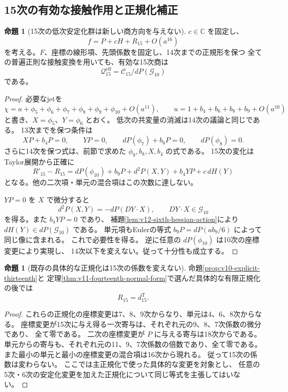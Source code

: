 \documentclass[a4paper,11pt]{ltjsarticle}
\theoremstyle{definition}
\newtheorem{proposition}[theorem]{命題}
\newcommand{\CC}{\mathbb C}
\begin{document}
\subsection{15次の有効な接触作用と正規化補正}
\label{subsec:v12-filtered-contact}

\begin{proposition}[15次の低次安定化群は新しい商方向を与えない]
\label{prop:v12-effective-contact-fifteen}
$c\in\CC$ を固定し、
\[
 f=P+cH+R_{15}+O(a^{16})
\]
を考える。$F$、座標の線形項、先頭係数を固定し、14次までの正規形を保つ
全ての普遍正則な接触変換を用いても、有効な15次商は
\[
 \mathcal Q^{\mathrm{eff}}_{15}
   =\mathcal C_{15}/dP(\mathcal G_{10})
\]
である。
\end{proposition}
\begin{proof}
必要なjetを
\[
 \chi=a+\phi_5+\phi_6+\phi_7+\phi_8+\phi_9+\phi_{10}+O(a^{11}),
 \qquad u=1+b_4+b_6+b_8+b_9+O(a^{10})
\]
と書き、$X=\phi_5$、$Y=\phi_6$ とおく。
低次の共変量の消滅は14次の議論と同じである。
13次までを保つ条件は
\[
 XP+b_4P=0,\qquad YP=0,\qquad
 dP(\phi_7)+b_6P=0,\qquad dP(\phi_8)=0.
\]
さらに14次を保つ式は、前節で求めた
$\phi_9,b_8,X,b_4$ の式である。
15次の変化はTaylor展開から正確に
\[
 R'_{15}-R_{15}
 =dP(\phi_{10})+b_9P+d^2P(X,Y)+b_4YP+c\,dH(Y)
\]
となる。他の二次項・単元の混合項はこの次数に達しない。

$YP=0$ を $X$ で微分すると
\[
 d^2P(X,Y)=-dP(DY\cdot X),\qquad DY\cdot X\in\mathcal G_{10}
\]
を得る。また $b_4YP=0$ であり、
補題\ref{lem:v12-sixth-hessian-action}により
$dH(Y)\in dP(\mathcal G_{10})$ である。
単元項もEulerの等式 $b_9P=dP(ab_9/6)$ によって同じ像に含まれる。
これで必要性を得る。
逆に任意の $dP(\phi_{10})$ は10次の座標変更により実現し、
14次以下を変えない。従って十分性も成立する。
\end{proof}

\begin{proposition}[既存の具体的な正規化は15次の係数を変えない]
\label{prop:v12-actual-fifteen-correction}
命題\ref{prop:v10-explicit-thirteenth}と
定理\ref{thm:v11-fourteenth-normal-form}で選んだ具体的な有限正規化の後では
\[
 R_{15}=d^{\mathrm T}_{15}.
\]
\end{proposition}
\begin{proof}
これらの正規化の座標変更は7、8、9次からなり、単元は4、6、8次からなる。
座標変更が15次に与え得る一次寄与は、それぞれ元の9、8、7次係数の微分であり、
全て零である。
二次の座標変更が $P$ に与える寄与は18次からである。
単元からの寄与も、それぞれ元の11、9、7次係数の倍数であり、全て零である。
また最小の単元と最小の座標変更の混合項は16次から現れる。
従って15次の係数は変わらない。
ここでは主正規化で使った具体的な変更を対象とし、
任意の5次・6次の安定化変更を加えた正規化について同じ等式を主張してはいない。
\end{proof}
\end{document}
